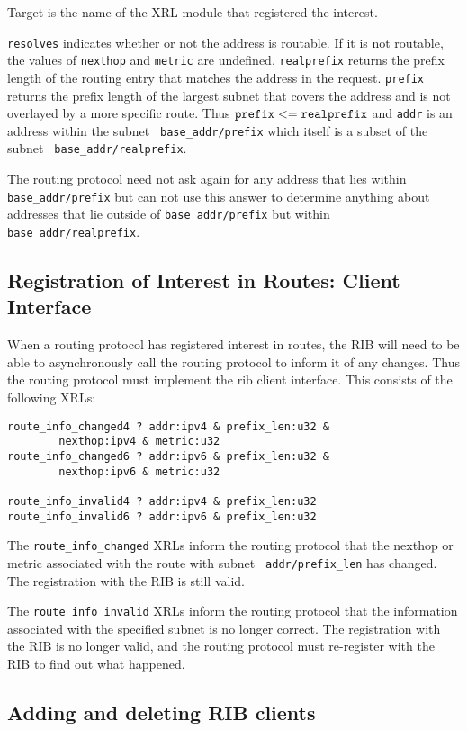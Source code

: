 \documentclass[11pt]{article}
\begin{document}
Target is the name of the XRL module that registered the interest.

{\tt resolves} indicates whether or not the address is routable.  If
it is not routable, the values of {\tt nexthop} and {\tt metric} are
undefined.  {\tt realprefix} returns the prefix length of the routing
entry that matches the address in the request.  {\tt prefix} returns
the prefix length of the largest subnet that covers the address and is
not overlayed by a more specific route.  Thus ${\tt prefix} <= {\tt
realprefix}$ and {\tt addr} is an address within the subnet {\tt
base\_addr/prefix} which itself is a subset of the subnet {\tt
base\_addr/realprefix}.  

The routing protocol need not ask again for any address that lies
within {\tt base\_addr/prefix} but can not use this answer to determine
anything about addresses that lie outside of {\tt base\_addr/prefix}
but within {\tt base\_addr/realprefix}.

\subsection{Registration of Interest in Routes: Client Interface}
When a routing protocol has registered interest in routes, the RIB
will need to be able to asynchronously call the routing protocol to
inform it of any changes.  Thus the routing protocol must implement
the rib client interface.  This consists of the following XRLs:
\begin{verbatim}
route_info_changed4 ? addr:ipv4 & prefix_len:u32 & 
        nexthop:ipv4 & metric:u32
route_info_changed6 ? addr:ipv6 & prefix_len:u32 & 
        nexthop:ipv6 & metric:u32

route_info_invalid4 ? addr:ipv4 & prefix_len:u32
route_info_invalid6 ? addr:ipv6 & prefix_len:u32
\end{verbatim}
The {\tt route\_info\_changed} XRLs inform the routing protocol that the
nexthop or metric associated with the route with subnet {\tt
addr/prefix\_len} has changed.  The registration with the RIB is still
valid.

The {\tt route\_info\_invalid} XRLs inform the routing protocol that the
information associated with the specified subnet is no longer correct.
The registration with the RIB is no longer valid, and the routing
protocol must re-register with the RIB to find out what happened.


\subsection{Adding and deleting RIB clients}
\end{document}
